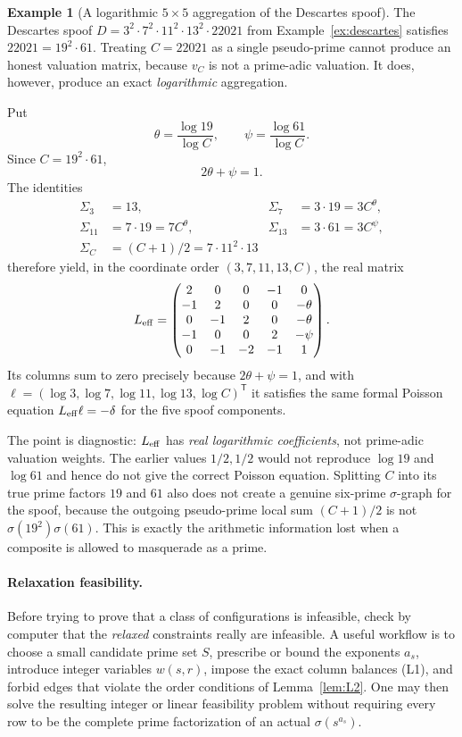 \documentclass[11pt]{article}
\theoremstyle{definition}
\newtheorem{example}[theorem]{Example}
\theoremstyle{remark}
\begin{document}
\begin{example}[A logarithmic $5\times5$ aggregation of the Descartes spoof]\label{ex:descartes_lap}
The Descartes spoof
$D=3^2\cdot7^2\cdot11^2\cdot13^2\cdot22021$ from
Example~\ref{ex:descartes} satisfies
$22021=19^2\cdot61$.  Treating $C=22021$ as a single pseudo-prime cannot
produce an honest valuation matrix, because $v_C$ is not a prime-adic
valuation.  It does, however, produce an exact \emph{logarithmic}
aggregation.

Put
\[
\theta=\frac{\log19}{\log C},\qquad
\psi=\frac{\log61}{\log C}.
\]
Since $C=19^2\cdot61$,
\[
2\theta+\psi=1.
\]
The identities
\[
\begin{aligned}
\Sigma_3&=13, &
\Sigma_7&=3\cdot19=3C^{\theta},\\
\Sigma_{11}&=7\cdot19=7C^{\theta}, &
\Sigma_{13}&=3\cdot61=3C^{\psi},\\
\Sigma_C&=(C+1)/2=7\cdot11^2\cdot13
\end{aligned}
\]
therefore yield, in the coordinate order $(3,7,11,13,C)$, the real matrix
\[
L_{\rm eff}=\begin{pmatrix}
 2 &  0 &  0 & -1 &  0 \\
-1 &  2 &  0 &  0 & -\theta \\
 0 & -1 &  2 &  0 & -\theta \\
-1 &  0 &  0 &  2 & -\psi \\
 0 & -1 & -2 & -1 &  1
\end{pmatrix}.
\]
Its columns sum to zero precisely because $2\theta+\psi=1$, and with
$\ell=(\log3,\log7,\log11,\log13,\log C)^{\mathsf T}$ it satisfies the
same formal Poisson equation $L_{\rm eff}\ell=-\delta$ for the five spoof
components.

The point is diagnostic: $L_{\rm eff}$ has \emph{real logarithmic
coefficients}, not prime-adic valuation weights.  The earlier values
$1/2,1/2$ would not reproduce $\log19$ and $\log61$ and hence do not give
the correct Poisson equation.  Splitting $C$ into its true prime factors
$19$ and $61$ also does not create a genuine six-prime $\sigma$-graph for
the spoof, because the outgoing pseudo-prime local sum $(C+1)/2$ is not
$\sigma(19^2)\sigma(61)$.  This is exactly the arithmetic information lost
when a composite is allowed to masquerade as a prime.
\end{example}

\paragraph{Relaxation feasibility.}
Before trying to prove that a class of configurations is infeasible, check by
computer that the \emph{relaxed} constraints really are infeasible.  A useful
workflow is to choose a small candidate prime set $S$, prescribe or bound the
exponents $a_s$, introduce integer variables $w(s,r)$, impose the exact
column balances (L1), and forbid edges that violate the order conditions of
Lemma~\ref{lem:L2}.  One may then solve the resulting integer or linear
feasibility problem without requiring every row to be the complete prime
factorization of an actual $\sigma(s^{a_s})$.
\end{document}
